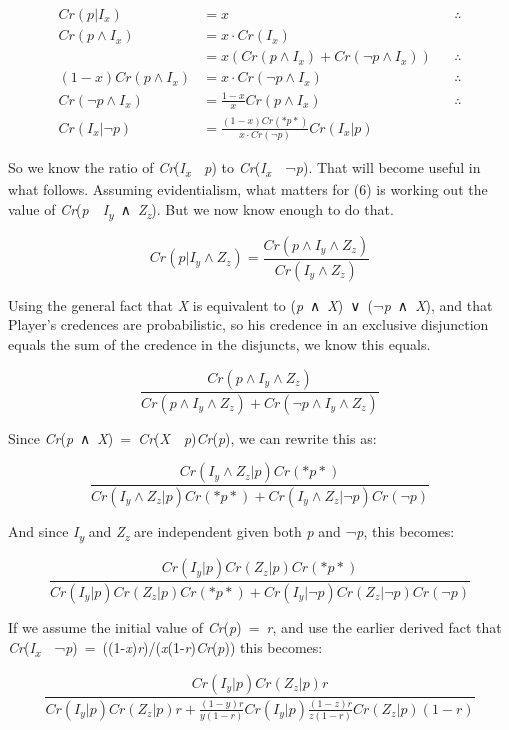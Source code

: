 \documentclass[
  11pt,
  letterpaper,
  DIV=11,
  numbers=noendperiod,
  twoside]{scrartcl}
\begin{document}
\begin{align*}
Cr(p | I_x) &= x &&\therefore \\
Cr(p ∧ I_x) &= x \cdot Cr(I_x) \\
 &= x (Cr(p ∧ I_x) + Cr(\neg p ∧ I_x)) &&\therefore \\
(1-x)Cr(p ∧ I_x) &= x \cdot Cr(\neg p ∧ I_x) &&\therefore \\
Cr(\neg p ∧ I_x) &= \frac{1-x}{x} Cr(p ∧ I_x) &&\therefore \\
Cr(I_x | \neg p) &= \frac{(1-x)Cr(*p*)}{x\cdot Cr(\neg p)}Cr(I_x | p)
\end{align*}

So we know the ratio of
\emph{Cr}(\emph{I\textsubscript{x}}~\textbar~\emph{p}) to
\emph{Cr}(\emph{I\textsubscript{x}}~\textbar~¬\emph{p}). That will
become useful in what follows. Assuming evidentialism, what matters for
(6) is working out the value of
\emph{Cr}(\emph{p}~\textbar~\emph{I\textsubscript{y}}~∧~\emph{Z\textsubscript{z}}).
But we now know enough to do that.

\[
Cr(p | I_y ∧ Z_z) = \frac{Cr(p ∧ I_y ∧ Z_z)}{Cr(I_y ∧ Z_z)}
\]

Using the general fact that \emph{X} is equivalent to
(\emph{p}~∧~\emph{X})~∨~(¬\emph{p}~∧~\emph{X}), and that Player's
credences are probabilistic, so his credence in an exclusive disjunction
equals the sum of the credence in the disjuncts, we know this equals.

\[
\frac{Cr(p ∧ I_y ∧ Z_z)}{Cr(p ∧ I_y ∧ Z_z) + Cr(\neg p ∧ I_y ∧ Z_z)}
\]

Since
\emph{Cr}(\emph{p}~∧~\emph{X})~=~\emph{Cr}(\emph{X}~\textbar~\emph{p})\emph{Cr}(\emph{p}),
we can rewrite this as:

\[
\frac{Cr(I_y ∧ Z_z | p) Cr(*p*)}{Cr(I_y ∧ Z_z | p)Cr(*p*) + Cr(I_y ∧ Z_z | \neg p)Cr(\neg p)}
\]

And since \emph{I\textsubscript{y}} and \emph{Z\textsubscript{z}} are
independent given both \emph{p} and ¬\emph{p}, this becomes:

\[
\frac{Cr(I_y| p) Cr(Z_z | p) Cr(*p*)}{Cr(I_y| p) Cr(Z_z | p) Cr(*p*) + Cr(I_y| \neg p) Cr(Z_z | \neg p) Cr(\neg p)}
\]

If we assume the initial value of \emph{Cr}(\emph{p})~=~\emph{r}, and
use the earlier derived fact that
\emph{Cr}(\emph{I\textsubscript{x}}~\textbar~¬\emph{p})~=~((1-\emph{x})\emph{r})/(\emph{x}(1-\emph{r})\emph{Cr}(\emph{p}))
this becomes:

\[
\frac{Cr(I_y| p) Cr(Z_z | p)r}{Cr(I_y| p) Cr(Z_z | p)r + \frac{(1-y)r}{y(1-r)} Cr(I_y| p) \frac{(1-z)r}{z(1-r)} Cr(Z_z | p) (1-r)}
\]
\end{document}
